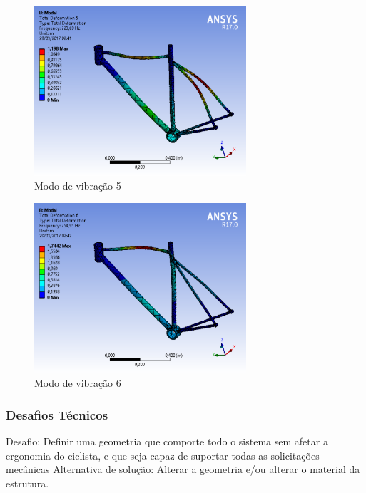 		\graphicspath{{figuras/}}
			\begin{figure}[h!]
			\centering
			\includegraphics[width=0.7\textwidth]{modo_de_vibracao_5.png}
			\caption{Modo de vibração 5}
			\label{img:modo_de_vibracao5}
			\end{figure}	
		
		\graphicspath{{figuras/}}
			\begin{figure}[h!]
			\centering
			\includegraphics[width=0.7\textwidth]{modo_de_vibracao_6.png}
			\caption{Modo de vibração 6}
			\label{img:modo_de_vibracao 6}
			\end{figure}	

\clearpage

	
	
	
	\subsubsection{Desafios Técnicos}
	Desafio: Definir uma geometria que comporte todo o sistema sem afetar a ergonomia do ciclista, e que seja capaz de suportar todas as solicitações mecânicas
	Alternativa de solução: Alterar a geometria e/ou alterar o material da estrutura.

